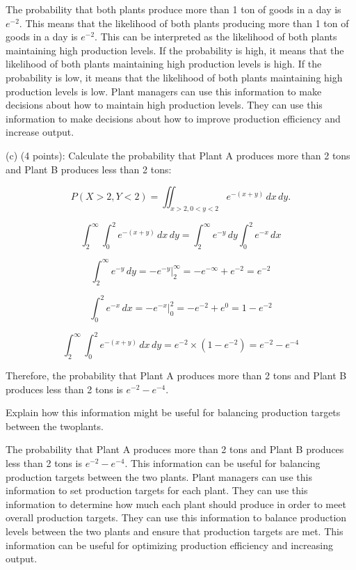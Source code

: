 \documentclass{article}
\begin{document}
The probability that both plants produce more than 1 ton of goods in a day is \(e^{-2}\). This means that the likelihood of both plants producing more than 1 ton of goods in a day is \(e^{-2}\). This can be interpreted as the likelihood of both plants maintaining high production levels. If the probability is high, it means that the likelihood of both plants maintaining high production levels is high. If the probability is low, it means that the likelihood of both plants maintaining high production levels is low. Plant managers can use this information to make decisions about how to maintain high production levels. They can use this information to make decisions about how to improve production efficiency and increase output.\newline

(c) (4 points): Calculate the probability that Plant A produces more than 2 tons and Plant B
produces less than 2 tons:

\[P(X > 2, Y < 2) =\iint_{x > 2, 0 < y < 2} e^{-(x+y)} \, dx \, dy.\]

\[\int_{2}^{\infty}\int_{0}^{2}e^{-(x+y)} \, dx \, dy = \int_{2}^{\infty}e^{-y} \, dy \int_{0}^{2}e^{-x} \, dx\]

\[\int_{2}^{\infty}e^{-y} \, dy = -e^{-y}\Big|_{2}^{\infty} = -e^{-\infty} + e^{-2} = e^{-2}\]

\[\int_{0}^{2}e^{-x} \, dx = -e^{-x}\Big|_{0}^{2} = -e^{-2} + e^{0} = 1 - e^{-2}\]

\[\int_{2}^{\infty}\int_{0}^{2}e^{-(x+y)} \, dx \, dy = e^{-2} \times (1 - e^{-2}) = e^{-2} - e^{-4}\]

Therefore, the probability that Plant A produces more than 2 tons and Plant B produces less than 2 tons is \(e^{-2} - e^{-4}\).

Explain how this information might be useful for balancing production targets between the twoplants.

The probability that Plant A produces more than 2 tons and Plant B produces less than 2 tons is \(e^{-2} - e^{-4}\). This information can be useful for balancing production targets between the two plants. Plant managers can use this information to set production targets for each plant. They can use this information to determine how much each plant should produce in order to meet overall production targets. They can use this information to balance production levels between the two plants and ensure that production targets are met. This information can be useful for optimizing production efficiency and increasing output.
\end{document}
